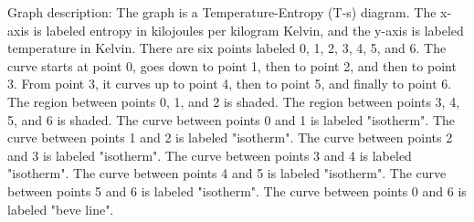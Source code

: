 Graph description:
The graph is a Temperature-Entropy (T-s) diagram. The x-axis is labeled entropy in kilojoules per kilogram Kelvin, and the y-axis is labeled temperature in Kelvin.
There are six points labeled 0, 1, 2, 3, 4, 5, and 6.
The curve starts at point 0, goes down to point 1, then to point 2, and then to point 3.
From point 3, it curves up to point 4, then to point 5, and finally to point 6.
The region between points 0, 1, and 2 is shaded.
The region between points 3, 4, 5, and 6 is shaded.
The curve between points 0 and 1 is labeled "isotherm".
The curve between points 1 and 2 is labeled "isotherm".
The curve between points 2 and 3 is labeled "isotherm".
The curve between points 3 and 4 is labeled "isotherm".
The curve between points 4 and 5 is labeled "isotherm".
The curve between points 5 and 6 is labeled "isotherm".
The curve between points 0 and 6 is labeled "beve line".